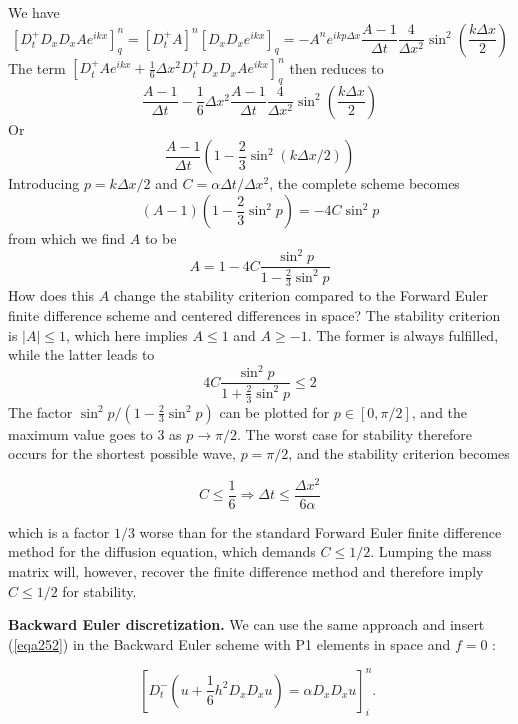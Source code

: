 \documentclass[../main.tex]{subfiles}
\begin{document}
		We have
		$$
		\left[D_{t}^{+} D_{x} D_{x} A e^{i k x}\right]_{q}^{n}=\left[D_{t}^{+} A\right]^{n}\left[D_{x} D_{x} e^{i k x}\right]_{q}=-A^{n} e^{i k p \Delta x} \frac{A-1}{\Delta t} \frac{4}{\Delta x^{2}} \sin ^{2}\left(\frac{k \Delta x}{2}\right)
		$$
		The term $\left[D_{t}^{+} A e^{i k x}+\frac{1}{6} \Delta x^{2} D_{t}^{+} D_{x} D_{x} A e^{i k x}\right]_{q}^{n}$ then reduces to
		$$
		\frac{A-1}{\Delta t}-\frac{1}{6} \Delta x^{2} \frac{A-1}{\Delta t} \frac{4}{\Delta x^{2}} \sin ^{2}\left(\frac{k \Delta x}{2}\right)
		$$
		Or
		$$
		\frac{A-1}{\Delta t}\left(1-\frac{2}{3} \sin ^{2}(k \Delta x / 2)\right)
		$$
		Introducing $p=k \Delta x / 2$ and $C=\alpha \Delta t / \Delta x^{2}$, the complete scheme becomes
		$$
		(A-1)\left(1-\frac{2}{3} \sin ^{2} p\right)=-4 C \sin ^{2} p
		$$
		from which we find $A$ to be
		$$
		A=1-4 C \frac{\sin ^{2} p}{1-\frac{2}{3} \sin ^{2} p}
		$$\smallbreak 
		How does this $A$ change the stability criterion compared to the Forward Euler finite difference scheme and centered differences in space? The stability criterion is $|A| \leq 1$, which here implies $A \leq 1$ and $A \geq-1$. The former is always fulfilled, while the latter leads to
		$$
		4 C \frac{\sin ^{2} p}{1+\frac{2}{3} \sin ^{2} p} \leq 2
		$$
		The factor $\sin ^{2} p /\left(1-\frac{2}{3} \sin ^{2} p\right)$ can be plotted for $p \in[0, \pi / 2]$, and the maximum value goes to 3 as $p \rightarrow \pi / 2$. The worst case for stability therefore occurs for the shortest possible wave, $p=\pi / 2$, and the stability criterion becomes

	\begin{equation}
	\label{eqa254}
		C \leq \frac{1}{6} \Rightarrow \Delta t \leq \frac{\Delta x^{2}}{6 \alpha}
	\end{equation}

		\noindent which is a factor $1 / 3$ worse than for the standard Forward Euler finite difference method for the diffusion equation, which demands $C \leq 1 / 2$. Lumping the mass matrix will, however, recover the finite difference method and therefore imply $C \leq 1 / 2$ for stability.
		
		\noindent \textbf{Backward Euler discretization.   } We can use the same approach and insert (\ref{eqa252}) in the Backward Euler scheme with P1 elements in space and $f=0$ :

	\begin{equation}
		\label{eqa255}
		\left[D_{t}^{-}\left(u+\frac{1}{6} h^{2} D_{x} D_{x} u\right)=\alpha D_{x} D_{x} u\right]_{i}^{n} \text {. }
	\end{equation}
\end{document}
